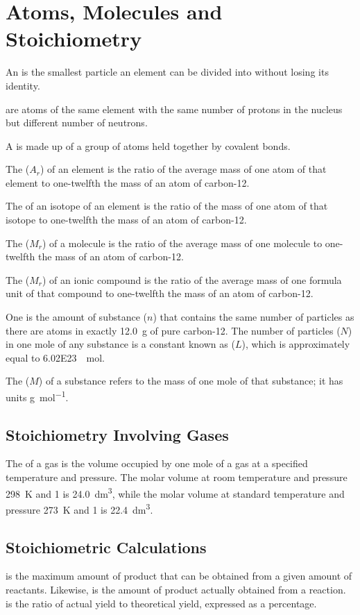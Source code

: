 \documentclass[Chemistry.tex]{subfiles}
\begin{document}
\chapter{Atoms, Molecules and Stoichiometry}
An  is the smallest particle an element can be divided into without losing its identity.

 are atoms of the same element with the same number of protons in the nucleus but different number of neutrons.

A  is made up of a group of atoms held together by covalent bonds.

The  (\(A_r\)) of an element is the ratio of the average mass of one atom of that element to one-twelfth the mass of an atom of carbon-12.

The  of an isotope of an element is the ratio of the mass of one atom of that isotope to one-twelfth the mass of an atom of carbon-12.

The  (\(M_r\)) of a molecule is the ratio of the average mass of one molecule to one-twelfth the mass of an atom of carbon-12.

The  (\(M_r\)) of an ionic compound is the ratio of the average mass of one formula unit of that compound to one-twelfth the mass of an atom of carbon-12.

One  is the amount of substance (\(n\)) that contains the same number of particles as there are atoms in exactly \SI{12.0}{\gram} of pure carbon-12. The number of particles (\(N\)) in one mole of any substance is a constant known as  (\(L\)), which is approximately equal to \SI{6.02E23}{\per\mole}.

The  (\(M\)) of a substance refers to the mass of one mole of that substance; it has units \si{\gram\per\mole}.
\section{Stoichiometry Involving Gases}
The  of a gas is the volume occupied by one mole of a gas at a specified temperature and pressure. The molar volume at room temperature and pressure \SI{298}{\kelvin} and \SI{1}{\atmosphere} is \SI{24.0}{\cubic\deci\metre}, while the molar volume at standard temperature and pressure \SI{273}{\kelvin} and \SI{1}{\atmosphere} is \SI{22.4}{\cubic\deci\metre}.
\section{Stoichiometric Calculations}
 is the maximum amount of product that can be obtained from a given amount of reactants. Likewise,  is the amount of product actually obtained from a reaction.  is the ratio of actual yield to theoretical yield, expressed as a percentage.
\end{document}
